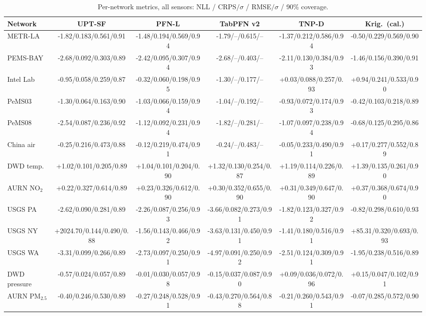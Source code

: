 \begin{table}[h]\centering\scriptsize
\caption{Per-network metrics, all sensors: NLL / CRPS$/\sigma$ / RMSE$/\sigma$ / 90\% coverage.}
\setlength{\tabcolsep}{2pt}
\begin{adjustbox}{max width=\linewidth}
\begin{tabular}{lccccc}
\toprule
Network & UPT-SF & PFN-L & TabPFN v2 & TNP-D & Krig.\ (cal.) \\
\midrule
METR-LA & -1.82/0.183/0.561/0.91 & -1.48/0.194/0.569/0.94 & -1.79/--/0.615/-- & -1.37/0.212/0.586/0.94 & -0.50/0.229/0.569/0.90 \\
PEMS-BAY & -2.68/0.092/0.303/0.89 & -2.42/0.095/0.307/0.94 & -2.68/--/0.403/-- & -2.11/0.130/0.384/0.93 & -1.46/0.156/0.390/0.91 \\
Intel Lab & -0.95/0.058/0.259/0.87 & -0.32/0.060/0.198/0.95 & -1.30/--/0.177/-- & +0.03/0.088/0.257/0.93 & +0.94/0.241/0.533/0.90 \\
PeMS03 & -1.30/0.064/0.163/0.90 & -1.03/0.066/0.159/0.94 & -1.04/--/0.192/-- & -0.93/0.072/0.174/0.93 & -0.42/0.103/0.218/0.89 \\
PeMS08 & -2.54/0.087/0.236/0.92 & -1.12/0.092/0.231/0.94 & -1.82/--/0.281/-- & -1.07/0.097/0.238/0.94 & -0.68/0.125/0.295/0.86 \\
China air & -0.25/0.216/0.473/0.88 & -0.12/0.219/0.474/0.91 & -0.24/--/0.483/-- & -0.05/0.233/0.490/0.91 & +0.17/0.277/0.552/0.89 \\
DWD temp. & +1.02/0.101/0.205/0.89 & +1.04/0.101/0.204/0.90 & +1.32/0.130/0.254/0.87 & +1.19/0.114/0.226/0.89 & +1.39/0.135/0.261/0.90 \\
AURN NO$_2$ & +0.22/0.327/0.614/0.89 & +0.23/0.326/0.612/0.90 & +0.30/0.352/0.655/0.90 & +0.31/0.349/0.647/0.90 & +0.37/0.368/0.674/0.90 \\
USGS PA & -2.62/0.090/0.281/0.89 & -2.26/0.087/0.256/0.93 & -3.66/0.082/0.273/0.91 & -1.82/0.123/0.327/0.92 & -0.82/0.298/0.610/0.93 \\
USGS NY & +2024.70/0.144/0.490/0.88 & -1.56/0.143/0.466/0.92 & -3.63/0.131/0.450/0.91 & -1.41/0.180/0.516/0.91 & +85.31/0.320/0.693/0.93 \\
USGS WA & -3.31/0.099/0.266/0.89 & -2.73/0.097/0.250/0.91 & -4.97/0.091/0.250/0.92 & -2.51/0.124/0.309/0.91 & -1.95/0.238/0.516/0.89 \\
DWD pressure & -0.57/0.024/0.057/0.89 & -0.01/0.030/0.057/0.98 & -0.15/0.037/0.087/0.90 & +0.09/0.036/0.072/0.96 & +0.15/0.047/0.102/0.91 \\
AURN PM$_{2.5}$ & -0.40/0.246/0.530/0.89 & -0.27/0.248/0.528/0.91 & -0.43/0.270/0.564/0.88 & -0.21/0.260/0.543/0.91 & -0.07/0.285/0.572/0.90 \\
\bottomrule
\end{tabular}
\end{adjustbox}
\end{table}
